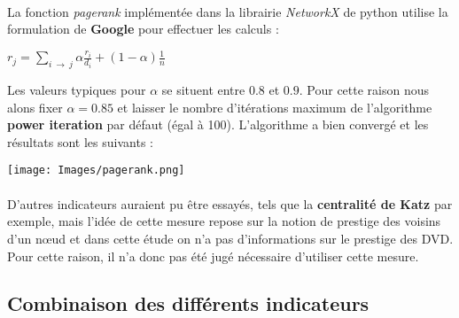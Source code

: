 \documentclass[14pt, openany]{article}
\begin{document}
\paragraph{}
La fonction \textit{pagerank} implémentée dans la librairie \textit{NetworkX} de python utilise la formulation de \textbf{Google} pour effectuer les calculs :
\begin{center}
$r_j = \sum\limits_{i~\rightarrow~j}\alpha\frac{r_i}{d_i}+(1-\alpha)\frac{1}{n}$
\end{center}
Les valeurs typiques pour $\alpha$ se situent entre $0.8$ et $0.9$. Pour cette raison nous alons fixer $\alpha=0.85$ et laisser le nombre d'itérations maximum de l'algorithme \textbf{power iteration} par défaut (égal à 100). L'algorithme a bien convergé et les résultats sont les suivants :
\begin{center}
\texttt{[image: Images/pagerank.png]}
\label{fig1}
\end{center}

\paragraph{}
D'autres indicateurs auraient pu être essayés, tels que la \textbf{centralité de Katz} par exemple, mais l'idée de cette mesure repose sur la notion de prestige des voisins d'un nœud et dans cette étude on n'a pas d'informations sur le prestige des DVD. Pour cette raison, il n'a donc pas été jugé nécessaire d'utiliser cette mesure.  
\subsection{Combinaison des différents indicateurs}
\end{document}

